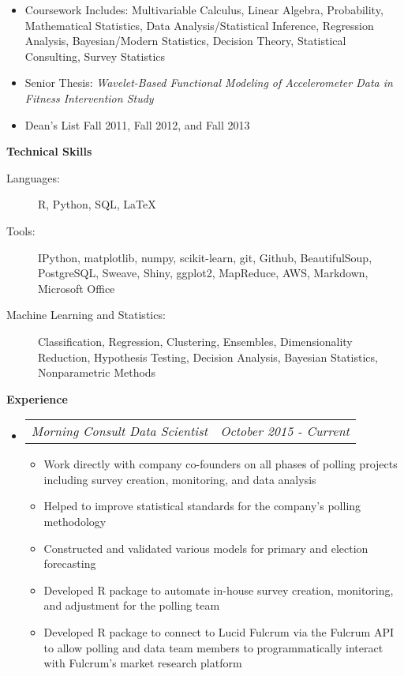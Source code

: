 \documentclass[letterpaper,12pt]{article}
\makeatletter
\newcommand{\resitem}[1]{\item #1 \vspace{-2pt}}
\newcommand{\resheading}[1]{{\large \colorbox{mygrey}{\begin{minipage}{\textwidth}{\textbf{#1 \vphantom{p\^{E}}}}\end{minipage}}}}
\newcommand{\ressubsubheading}[2]{
\begin{tabular*}{6.5in}{l@{\extracolsep{\fill}}r}
		\textit{#1} & \textit{#2} \\
\end{tabular*}\vspace{-6pt}}
\makeatother
\begin{document}
				{ \footnotesize
				\begin{itemize}
					\resitem{Coursework Includes: Multivariable Calculus, Linear Algebra, Probability, Mathematical Statistics, Data Analysis/Statistical Inference, Regression Analysis, Bayesian/Modern Statistics, Decision Theory, Statistical Consulting, Survey Statistics}
					\resitem{Senior Thesis: \textit{Wavelet-Based Functional Modeling of Accelerometer Data in Fitness Intervention Study}} 
					\resitem{Dean's List Fall 2011, Fall 2012, and Fall 2013} 
				\end{itemize}


\resheading{Technical Skills}
	\begin{description}
		\item[Languages:] { \footnotesize R, Python, SQL, \LaTeX
		}
		\item[Tools:] { \footnotesize IPython, matplotlib, numpy, scikit-learn, git, Github, BeautifulSoup, PostgreSQL, Sweave, Shiny, ggplot2, MapReduce, AWS, Markdown, Microsoft Office
		}
		\item[Machine Learning and Statistics:] { \footnotesize Classification, Regression, Clustering, Ensembles, Dimensionality Reduction, Hypothesis Testing, Decision Analysis, Bayesian Statistics, Nonparametric Methods
		}
	\end{description} %

\resheading{Experience}
	\begin{itemize}
		\item 
			\ressubsubheading{Morning Consult Data Scientist}{October 2015 - Current}
				{ \footnotesize
				\begin{itemize}
					\resitem{Work directly with company co-founders on all phases of polling projects including survey creation, monitoring, and data analysis}
					\resitem{Helped to improve statistical standards for the company's polling methodology}
					\resitem{Constructed and validated various models for primary and election forecasting}
					\resitem{Developed R package to automate in-house survey creation, monitoring, and adjustment for the polling team}
					\resitem{Developed R package to connect to Lucid Fulcrum via the Fulcrum API to allow polling and data team members to programmatically interact with Fulcrum's market research platform}


\end{itemize}}
\end{itemize}}
\end{document}
